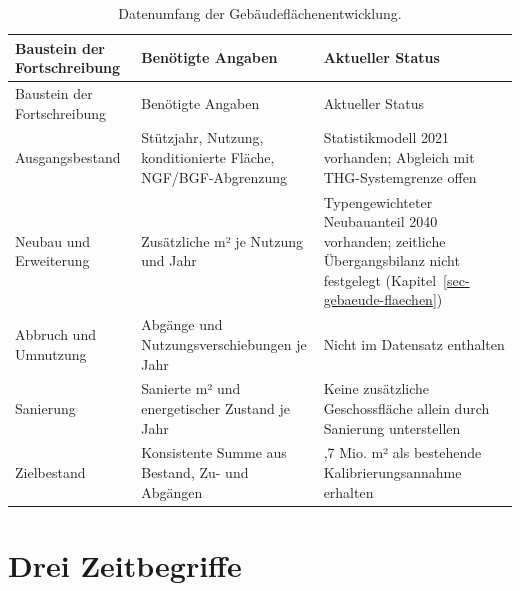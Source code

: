 \documentclass[
  ngerman,
  a4paper,
  DIV=11]{scrreprt}
\begin{document}
\begin{longtable}[]{@{}
  >{\raggedright\arraybackslash}p{}
  >{\raggedright\arraybackslash}p{}
  >{\raggedright\arraybackslash}p{}@{}}
\caption{Datenumfang der
Gebäudeflächenentwicklung.}\label{tbl-thg-fortschreibung}\tabularnewline
\toprule\noalign{}
\begin{minipage}[b]{\linewidth}\raggedright
Baustein der Fortschreibung
\end{minipage} & \begin{minipage}[b]{\linewidth}\raggedright
Benötigte Angaben
\end{minipage} & \begin{minipage}[b]{\linewidth}\raggedright
Aktueller Status
\end{minipage} \\
\midrule\noalign{}
\endfirsthead
\toprule\noalign{}
\begin{minipage}[b]{\linewidth}\raggedright
Baustein der Fortschreibung
\end{minipage} & \begin{minipage}[b]{\linewidth}\raggedright
Benötigte Angaben
\end{minipage} & \begin{minipage}[b]{\linewidth}\raggedright
Aktueller Status
\end{minipage} \\
\midrule\noalign{}
\endhead
\bottomrule\noalign{}
\endlastfoot
Ausgangsbestand & Stützjahr, Nutzung, konditionierte Fläche,
NGF/BGF-Abgrenzung & Statistikmodell 2021 vorhanden; Abgleich mit
THG-Systemgrenze offen \\
Neubau und Erweiterung & Zusätzliche m² je Nutzung und Jahr &
Typengewichteter Neubauanteil 2040 vorhanden; zeitliche Übergangsbilanz
nicht festgelegt (Kapitel~\ref{sec-gebaeude-flaechen}) \\
Abbruch und Umnutzung & Abgänge und Nutzungsverschiebungen je Jahr &
Nicht im Datensatz enthalten \\
Sanierung & Sanierte m² und energetischer Zustand je Jahr & Keine
zusätzliche Geschossfläche allein durch Sanierung unterstellen \\
Zielbestand & Konsistente Summe aus Bestand, Zu- und Abgängen & 906,7
Mio. m² als bestehende Kalibrierungsannahme erhalten \\
\end{longtable}

\section{Drei Zeitbegriffe}\label{drei-zeitbegriffe}
\end{document}

